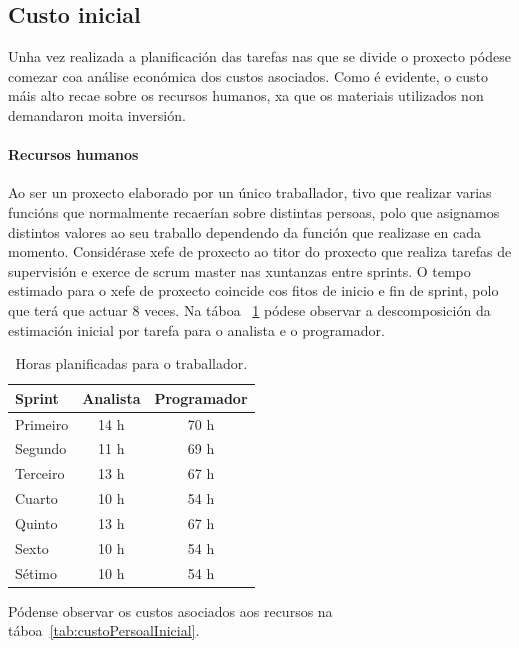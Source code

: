 \subsection{Custo inicial}
Unha vez realizada a planificación das tarefas nas que se divide o proxecto pódese comezar coa análise económica dos custos asociados. Como é evidente, o custo máis alto recae sobre os recursos humanos, xa que os materiais utilizados non demandaron moita inversión.

\paragraph{Recursos humanos}
Ao ser un proxecto elaborado por un único traballador, tivo que realizar varias funcións que normalmente recaerían sobre distintas persoas, polo que asignamos distintos valores ao seu traballo dependendo da función que realizase en cada momento. Considérase xefe de proxecto ao titor do proxecto que realiza tarefas de supervisión e exerce de scrum master nas xuntanzas entre sprints.
O tempo estimado para o xefe de proxecto coincide cos fitos de inicio e fin de sprint, polo que terá que actuar 8 veces.
Na táboa ~\ref{tab:horasTraballo} pódese observar a descomposición da estimación inicial por tarefa para o analista e o programador.

\begin{table} [tbh]
	\centering
	\begin{tabular}{|l|c|c|}
		\hline 
		\textbf{Sprint} & \textbf{Analista} & \textbf{Programador} \\ 
		\hline 
		Primeiro & 14 h & 70 h \\ 
		\hline 
		Segundo & 11 h & 69 h \\ 
		\hline 
		Terceiro & 13 h & 67 h \\ 
		\hline 
		Cuarto & 10 h & 54 h \\ 
		\hline 
		Quinto & 13 h & 67 h \\ 
		\hline 
		Sexto & 10 h & 54 h \\ 
		\hline 
		Sétimo & 10 h & 54 h \\ 
		\hline 
	\end{tabular}
	\caption{Horas planificadas para o traballador.}
	\label{tab:horasTraballo}
\end{table}

Pódense observar os custos asociados aos recursos na táboa~\ref{tab:custoPersoalInicial}.

